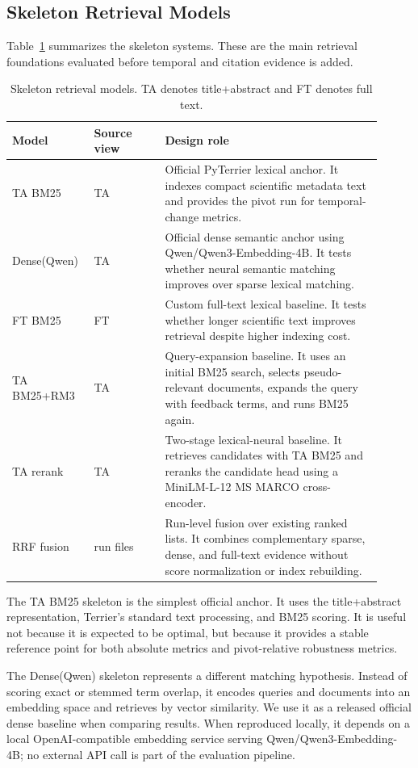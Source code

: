 \documentclass[11pt]{article}
\begin{document}
\subsection{Skeleton Retrieval Models}

Table~\ref{tab:skeleton-models} summarizes the skeleton systems. These are the main retrieval foundations evaluated before temporal and citation evidence is added.

\begin{table}[ht]
\centering
\caption{Skeleton retrieval models. TA denotes title+abstract and FT denotes full text.}
\label{tab:skeleton-models}
\begin{tabular}{p{0.18\linewidth}p{0.18\linewidth}p{0.55\linewidth}}
\toprule
Model & Source view & Design role \\
\midrule
TA BM25 & TA & Official PyTerrier lexical anchor. It indexes compact scientific metadata text and provides the pivot run for temporal-change metrics. \\
Dense(Qwen) & TA & Official dense semantic anchor using Qwen/Qwen3-Embedding-4B. It tests whether neural semantic matching improves over sparse lexical matching. \\
FT BM25 & FT & Custom full-text lexical baseline. It tests whether longer scientific text improves retrieval despite higher indexing cost. \\
TA BM25+RM3 & TA & Query-expansion baseline. It uses an initial BM25 search, selects pseudo-relevant documents, expands the query with feedback terms, and runs BM25 again. \\
TA rerank & TA & Two-stage lexical-neural baseline. It retrieves candidates with TA BM25 and reranks the candidate head using a MiniLM-L-12 MS MARCO cross-encoder. \\
RRF fusion & run files & Run-level fusion over existing ranked lists. It combines complementary sparse, dense, and full-text evidence without score normalization or index rebuilding. \\
\bottomrule
\end{tabular}
\end{table}

The TA BM25 skeleton is the simplest official anchor. It uses the title+abstract representation, Terrier's standard text processing, and BM25 scoring. It is useful not because it is expected to be optimal, but because it provides a stable reference point for both absolute metrics and pivot-relative robustness metrics.

The Dense(Qwen) skeleton represents a different matching hypothesis. Instead of scoring exact or stemmed term overlap, it encodes queries and documents into an embedding space and retrieves by vector similarity. We use it as a released official dense baseline when comparing results. When reproduced locally, it depends on a local OpenAI-compatible embedding service serving Qwen/Qwen3-Embedding-4B; no external API call is part of the evaluation pipeline.
\end{document}
